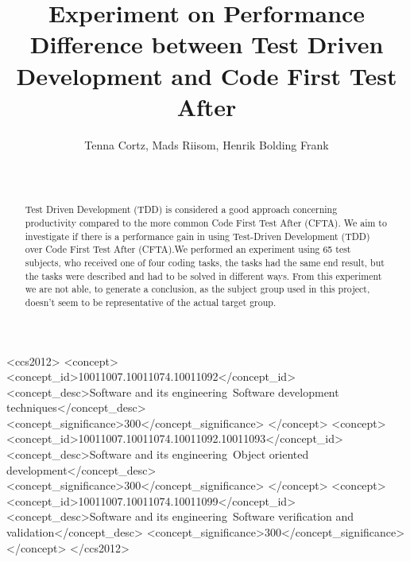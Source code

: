 \documentclass{sig-alternate-05-2015}
\begin{document}
	

\title{Experiment on Performance Difference between Test Driven Development and Code First Test After}

\author{
\alignauthor
Tenna Cortz, Mads Riisom, Henrik Bolding Frank\\
 \\
 \\
}


\maketitle
\begin{abstract}
Test Driven Development (TDD) is considered a good approach concerning productivity compared to the more common Code First Test After (CFTA). We aim to investigate if there is a performance gain in using Test-Driven Development (TDD) over Code First Test After (CFTA).We performed an experiment using 65 test subjects, who received one of four coding tasks, the tasks had the same end result, but the tasks were described and had to be solved in different ways.
From this experiment we are not able, to generate a conclusion, as the subject group used in this project, doesn't seem to be representative of the actual target group.

\end{abstract}

%
%
\begin{CCSXML}
<ccs2012>
<concept>
<concept_id>10011007.10011074.10011092</concept_id>
<concept_desc>Software and its engineering~Software development techniques</concept_desc>
<concept_significance>300</concept_significance>
</concept>
<concept>
<concept_id>10011007.10011074.10011092.10011093</concept_id>
<concept_desc>Software and its engineering~Object oriented development</concept_desc>
<concept_significance>300</concept_significance>
</concept>
<concept>
<concept_id>10011007.10011074.10011099</concept_id>
<concept_desc>Software and its engineering~Software verification and validation</concept_desc>
<concept_significance>300</concept_significance>
</concept>
</ccs2012>
\end{CCSXML}
\end{document}

